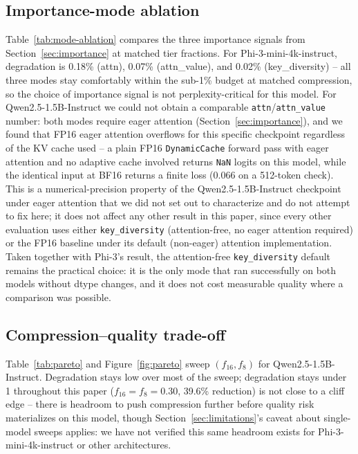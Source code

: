 \documentclass[conference]{IEEEtran}
\begin{document}
\subsection{Importance-mode ablation}
Table~\ref{tab:mode-ablation} compares the three importance signals from
Section~\ref{sec:importance} at matched tier fractions. For Phi-3-mini-4k-instruct,
degradation is 0.18\% (attn), 0.07\% (attn\_value), and 0.02\% (key\_diversity) --
all three modes stay comfortably within the sub-1\% budget at matched compression, so
the choice of importance signal is not perplexity-critical for this model. For
Qwen2.5-1.5B-Instruct we could not obtain a comparable \texttt{attn}/\texttt{attn\_value}
number: both modes require eager attention (Section~\ref{sec:importance}), and we found
that FP16 eager attention overflows for this specific checkpoint regardless of the KV
cache used -- a plain FP16 \texttt{DynamicCache} forward pass with eager attention and no
adaptive cache involved returns \texttt{NaN} logits on this model, while the identical
input at BF16 returns a finite loss (0.066 on a 512-token check). This is a
numerical-precision property of the Qwen2.5-1.5B-Instruct checkpoint under eager
attention that we did not set out to characterize and do not attempt to fix here; it
does not affect any other result in this paper, since every other evaluation uses either
\texttt{key\_diversity} (attention-free, no eager attention required) or the FP16
baseline under its default (non-eager) attention implementation. Taken together with
Phi-3's result, the attention-free \texttt{key\_diversity} default remains the practical
choice: it is the only mode that ran successfully on both models without dtype changes,
and it does not cost measurable quality where a comparison was possible.

\subsection{Compression--quality trade-off}
Table~\ref{tab:pareto} and Figure~\ref{fig:pareto} sweep $(f_{16}, f_8)$ for
Qwen2.5-1.5B-Instruct. Degradation stays low over most of the sweep; degradation stays under 1%
throughout this paper ($f_{16}{=}f_8{=}0.30$, 39.6\%
reduction) is not close to a cliff edge -- there is headroom to push compression further
before quality risk materializes on this model, though Section~\ref{sec:limitations}'s
caveat about single-model sweeps applies: we have not verified this same headroom exists
for Phi-3-mini-4k-instruct or other architectures.
\end{document}

